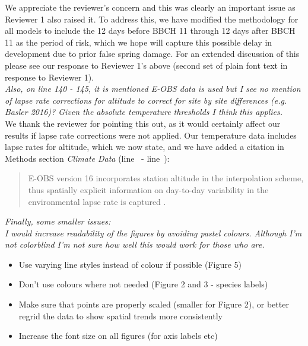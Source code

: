 \documentclass[11pt,a4paper]{article}\usepackage[]{graphicx}\usepackage[]{color}
\newcommand{\lr}[1]{line~\lineref{#1}}
\begin{document}
We appreciate the reviewer's concern and this was clearly an important issue as Reviewer 1 also raised it. To address this, we have modified the methodology for all models to include the 12 days before BBCH 11 through 12 days after BBCH 11 as the period of risk, which we hope will capture this possible delay in development due to prior false spring damage. For an extended discussion of this please see our response to Reviewer 1's above (second set of plain font text in response to Reviewer 1).\\

\textit{Also, on line 140 - 145, it is mentioned E-OBS data is used but I see no mention of lapse rate corrections for altitude to correct for site by site differences (e.g. Basler 2016)? Given the absolute temperature thresholds I think this applies.} \\

We thank the reviewer for pointing this out, as it would certainly affect our results if lapse rate corrections were not applied. Our temperature data includes lapse rates for altitude, which we now state, and we have added a citation in Methods section \textit{Climate Data} (\lr{R2clim} - \lr{R2climend}): \\

\begin{quotation}
\noindent  E-OBS version 16 incorporates station altitude in the interpolation scheme, thus spatially explicit information on day-to-day variability in the environmental lapse rate is captured \citep{Cornes2018}.
\end{quotation}


\textit{Finally, some smaller issues: }\\

\textit{I would increase readability of the figures by avoiding pastel colours. Although I'm not colorblind I'm not sure how well this would work for those who are. }\\

\begin{itemize}
\item Use varying line styles instead of colour if possible (Figure 5)
\item  Don't use colours where not needed (Figure 2 and 3 - species labels)
\item  Make sure that points are properly scaled (smaller for Figure 2), or better regrid the data to show spatial trends more consistently
\item Increase the font size on all figures (for axis labels etc)
\end{itemize}
\end{document}
